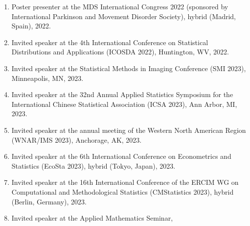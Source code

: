 \documentclass[12pt,letterpaper]{article}
\newenvironment{cventry}{\begin{minipage}[t]{\linewidth}}{\end{minipage}}
\begin{document}
\begin{enumerate}
\begin{cventry}
		2022 (NRC 2022, sponsored by IMS), George Mason University, 
		Fairfax, VA, 2022.
		\par\end{cventry}
		\item\begin{cventry} Poster presenter at the MDS International Congress 2022 (sponsored by International Parkinson and Movement Disorder Society), hybrid (Madrid, Spain), 2022.
		\par\end{cventry}
		\item\begin{cventry} Invited speaker at the 4th International Conference on 
		Statistical Distributions and Applications (ICOSDA 2022), 
		Huntington, WV, 2022.
		\par\end{cventry}
		\item\begin{cventry} Invited speaker at the Statistical Methods in Imaging 
		Conference (SMI 2023), Minneapolis, MN, 2023.
		\par\end{cventry}
		\item\begin{cventry} Invited speaker at the 32nd Annual Applied Statistics 
		Symposium for the International Chinese Statistical 
		Association (ICSA 2023), Ann Arbor, MI, 2023.
		\par\end{cventry}
		\item\begin{cventry} Invited speaker at the annual meeting of the Western 
		North American Region (WNAR/IMS 2023), Anchorage, AK, 2023.
		\par\end{cventry}
		\item\begin{cventry} Invited speaker at the 6th International Conference on 
		Econometrics and Statistics (EcoSta 2023), hybrid (Tokyo, 
		Japan), 2023.
		\par\end{cventry}
		\item\begin{cventry} Invited speaker at the 16th International Conference 
		of the ERCIM WG on Computational and Methodological 
		Statistics (CMStatistics 2023), hybrid (Berlin, Germany), 
		2023.
		\par\end{cventry}
		\item\begin{cventry} Invited speaker at the Applied Mathematics Seminar, 

\end{cventry}
\end{enumerate}
\end{document}
